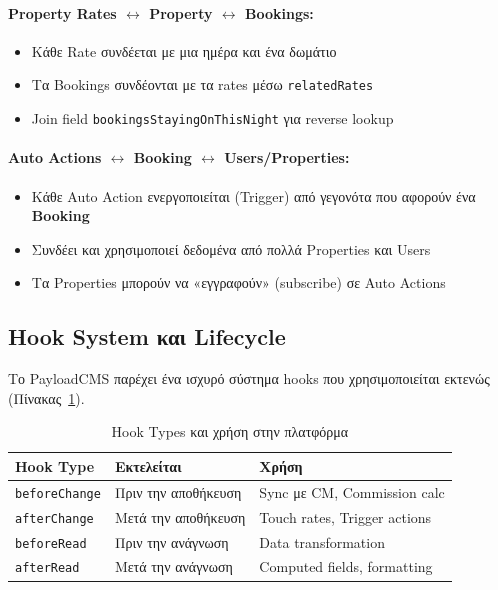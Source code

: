 \documentclass[
	12pt, %
	oneside, %
	greek,
	onehalfspacing, %
	liststotoc, %
	toctotoc, %
	parskip, %
	headsepline, %
]{MastersDoctoralThesis} %
\newcommand{\code}[1]{\texttt{#1}}
\begin{document}
\paragraph{Property Rates $\leftrightarrow$ Property $\leftrightarrow$ Bookings:}
\begin{itemize}
    \item Κάθε Rate συνδέεται με μια ημέρα και ένα δωμάτιο
    \item Τα Bookings συνδέονται με τα rates μέσω \code{relatedRates}
    \item Join field \code{bookingsStayingOnThisNight} για reverse lookup
\end{itemize}

\paragraph{Auto Actions $\leftrightarrow$ Booking $\leftrightarrow$ Users/Properties:}
\begin{itemize}
    \item Κάθε Auto Action ενεργοποιείται (Trigger) από γεγονότα που αφορούν ένα \textbf{Booking}
    \item Συνδέει και χρησιμοποιεί δεδομένα από πολλά Properties και Users
    \item Τα Properties μπορούν να «εγγραφούν» (subscribe) σε Auto Actions
\end{itemize}

\subsection{Hook System και Lifecycle}
\label{subsec:hook-system}

Το PayloadCMS παρέχει ένα ισχυρό σύστημα hooks που χρησιμοποιείται εκτενώς (Πίνακας~\ref{tab:hooks}).

\begin{table}[H]
\centering
\caption{Hook Types και χρήση στην πλατφόρμα}
\label{tab:hooks}
\begin{tabular}{@{}lll@{}}
\toprule
\textbf{Hook Type} & \textbf{Εκτελείται} & \textbf{Χρήση} \\
\midrule
\code{beforeChange} & Πριν την αποθήκευση & Sync με CM, Commission calc \\
\code{afterChange} & Μετά την αποθήκευση & Touch rates, Trigger actions \\
\code{beforeRead} & Πριν την ανάγνωση & Data transformation \\
\code{afterRead} & Μετά την ανάγνωση & Computed fields, formatting \\
\bottomrule
\end{tabular}
\end{table}
\end{document}
